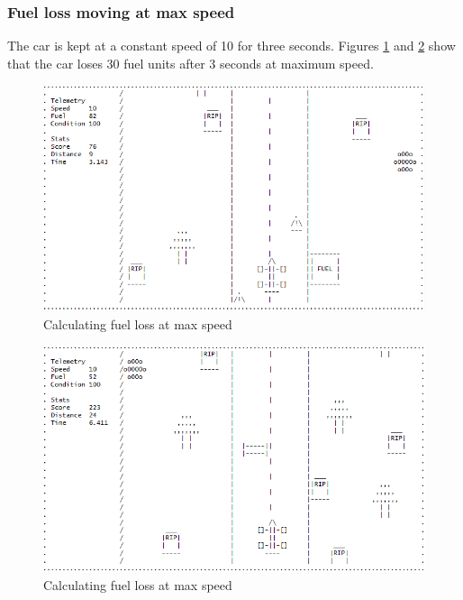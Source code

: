 \documentclass{article}
\begin{document}
\subsubsection*{Fuel loss moving at max speed}
The car is kept at a constant speed of 10 for three seconds. Figures \ref{fig:fuel_test_lossmaxspeed} and \ref{fig:fuel_test_lossmaxspeed2} show that the car loses 30 fuel units after 3 seconds at maximum speed. 
\begin{figure}[!ht]
	\begin{center}
	\includegraphics[width=0.63\paperwidth]{images/fuel_test_lossmaxspeed}
	\caption{Calculating fuel loss at max speed}
	\label{fig:fuel_test_lossmaxspeed} 
	\end{center}
\end{figure}
\begin{figure}[!ht]
	\begin{center}
	\includegraphics[width=0.63\paperwidth]{images/fuel_test_lossmaxspeed2}
	\caption{Calculating fuel loss at max speed}
	\label{fig:fuel_test_lossmaxspeed2} 
	\end{center}
\end{figure}
\newpage
\end{document}
